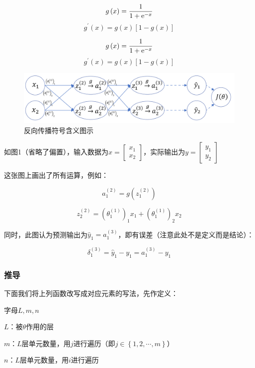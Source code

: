 \documentclass{article}
\begin{document}
\begin{definition}
    \[g\left(x\right)=\frac1{1+{\rm e}^{-x}}\]
    \[g^\prime\left(x\right)=g\left(x\right)\left[1-g\left(x\right)\right]\]
\end{definition}

\begin{corollary}
    \[g\left(x\right)=\frac1{1+{\rm e}^{-x}}\]
    \[g^\prime\left(x\right)=g\left(x\right)\left[1-g\left(x\right)\right]\]
\end{corollary}

\begin{figure}[H]
    \centering
    \includegraphics[width=\linewidth]{1}
    \caption{反向传播符号含义图示}
\end{figure}

如图1（省略了偏置），输入数据为$x=\begin{bmatrix}x_1\\x_2\end{bmatrix}$，实际输出为$y=\begin{bmatrix}y_1\\y_2\end{bmatrix}$

这张图上画出了所有运算，例如：

\[a_1^{\left(2\right)}=g\left(z_1^{\left(2\right)}\right)\]

\[z_2^{\left(2\right)}=\left(\theta_1^{\left(1\right)}\right)_1x_1+\left(\theta_1^{\left(1\right)}\right)_2x_2\]

同时，此图认为预测输出为$\hat y_1=a_1^{\left(3\right)}$，即有误差（注意此处不是定义而是结论）：

\[\delta_1^{\left(3\right)}=\hat y_1-y_1=a_1^{\left(3\right)}-y_1\]

\subsubsection{推导}

下面我们将上列函数改写成对应元素的写法，先作定义：

\begin{definition}[字母定义]
    字母$L,m,n$

    $L$：被$\theta$作用的层

    $m$：$L$层单元数量，用$j$进行遍历（即$j\in\left\{1,2,\cdots,m\right\}$）

    $n$：$L$层单元数量，用$i$进行遍历
\end{definition}
\end{document}
